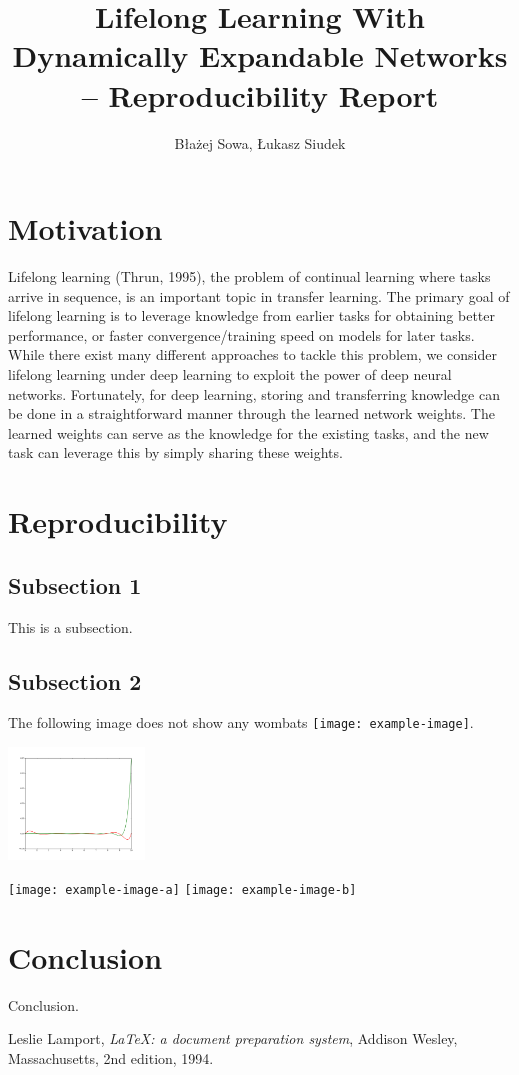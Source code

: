 \documentclass[12pt]{article}
\title{Lifelong Learning With Dynamically Expandable Networks -- Reproducibility Report }
\author{Błażej Sowa, Łukasz Siudek}
\date{}
\begin{document}
\maketitle

\section {Motivation}

Lifelong learning (Thrun, 1995), the problem of continual learning where tasks arrive in sequence, is
an important topic in transfer learning. The primary goal of lifelong learning is to leverage knowledge
from earlier tasks for obtaining better performance, or faster convergence/training speed on models
for later tasks. While there exist many different approaches to tackle this problem, we consider
lifelong learning under deep learning to exploit the power of deep neural networks. Fortunately, for
deep learning, storing and transferring knowledge can be done in a straightforward manner through
the learned network weights. The learned weights can serve as the knowledge for the existing tasks,
and the new task can leverage this by simply sharing these weights.

\section {Reproducibility}

\subsection {Subsection 1}
This is a subsection.

\subsection {Subsection 2}

The following image does not show any wombats
\texttt{[image: example-image]}.
  
\includegraphics[height=3cm]{figure_1.png}

\texttt{[image: example-image-a]} \texttt{[image: example-image-b]}

\section {Conclusion}

Conclusion.


\begin{thebibliography}{9}
        Leslie Lamport,
        \textit{\LaTeX: a document preparation system},
        Addison Wesley, Massachusetts,
        2nd edition,
        1994.
\end{thebibliography}
\end{document}
